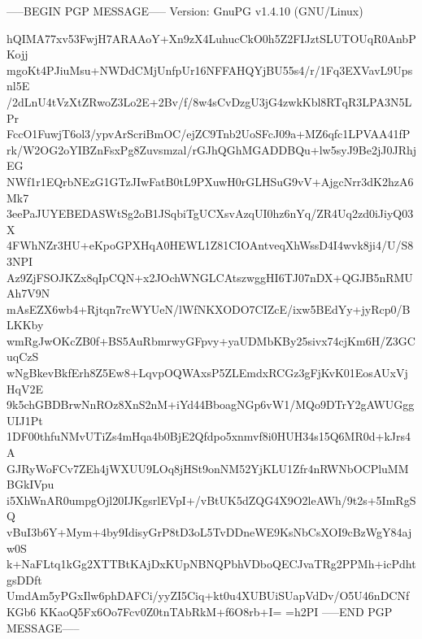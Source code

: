 -----BEGIN PGP MESSAGE-----
Version: GnuPG v1.4.10 (GNU/Linux)

hQIMA77xv53FwjH7ARAAoY+Xn9zX4LuhucCkO0h5Z2FIJztSLUTOUqR0AnbPKojj
mgoKt4PJiuMsu+NWDdCMjUnfpUr16NFFAHQYjBU55s4/r/1Fq3EXVavL9Upsnl5E
/2dLnU4tVzXtZRwoZ3Lo2E+2Bv/f/8w4sCvDzgU3jG4zwkKbl8RTqR3LPA3N5LPr
FccO1FuwjT6ol3/ypvArScriBmOC/ejZC9Tnb2UoSFcJ09a+MZ6qfc1LPVAA41fP
rk/W2OG2oYIBZnFsxPg8Zuvsmzal/rGJhQGhMGADDBQu+lw5syJ9Be2jJ0JRhjEG
NWf1r1EQrbNEzG1GTzJIwFatB0tL9PXuwH0rGLHSuG9vV+AjgcNrr3dK2hzA6Mk7
3eePaJUYEBEDASWtSg2oB1JSqbiTgUCXsvAzqUI0hz6nYq/ZR4Uq2zd0iJiyQ03X
4FWhNZr3HU+eKpoGPXHqA0HEWL1Z81CIOAntveqXhWssD4I4wvk8ji4/U/S83NPI
Az9ZjFSOJKZx8qIpCQN+x2JOchWNGLCAtszwggHI6TJ07nDX+QGJB5nRMUAh7V9N
mAsEZX6wb4+Rjtqn7rcWYUeN/lWfNKXODO7CIZcE/ixw5BEdYy+jyRcp0/BLKKby
wmRgJwOKcZB0f+BS5AuRbmrwyGFpvy+yaUDMbKBy25sivx74cjKm6H/Z3GCuqCzS
wNgBkevBkfErh8Z5Ew8+LqvpOQWAxsP5ZLEmdxRCGz3gFjKvK01EosAUxVjHqV2E
9k5chGBDBrwNnROz8XnS2nM+iYd44BboagNGp6vW1/MQo9DTrY2gAWUGggUIJ1Pt
1DF00thfuNMvUTiZs4mHqa4b0BjE2Qfdpo5xnmvf8i0HUH34s15Q6MR0d+kJrs4A
GJRyWoFCv7ZEh4jWXUU9LOq8jHSt9onNM52YjKLU1Zfr4nRWNbOCPluMMBGkIVpu
i5XhWnAR0umpgOjl20IJKgsrlEVpI+/vBtUK5dZQG4X9O2leAWh/9t2s+5ImRgSQ
vBuI3b6Y+Mym+4by9IdisyGrP8tD3oL5TvDDneWE9KsNbCsXOI9cBzWgY84ajw0S
k+NaFLtq1kGg2XTTBtKAjDxKUpNBNQPbhVDboQECJvaTRg2PPMh+icPdhtgsDDft
UmdAm5yPGxIlw6phDAFCi/yyZI5Ciq+kt0u4XUBUiSUapVdDv/O5U46nDCNfKGb6
KKaoQ5Fx6Oo7Fcv0Z0tnTAbRkM+f6O8rb+I=
=h2PI
-----END PGP MESSAGE-----
